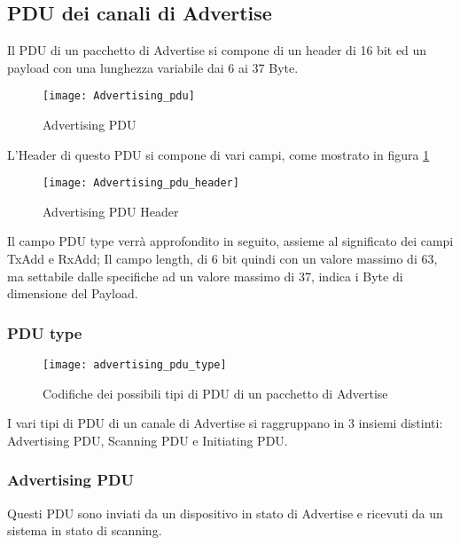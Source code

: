 


\subsection{PDU dei canali di Advertise}\label{pdus}
Il PDU di un pacchetto di Advertise si compone di un header di 16 bit ed un payload con una lunghezza variabile dai 6 ai 37 Byte.

\begin{figure}[H]
\texttt{[image: Advertising\_pdu]}
\centering
\caption{Advertising PDU}
\end{figure}

\noindent L'Header di questo PDU si compone di vari campi, come mostrato in figura \ref{Advertising_pdu_header}

\begin{figure}[H]
\texttt{[image: Advertising\_pdu\_header]}
\centering
\caption{Advertising PDU Header}
\label{Advertising_pdu_header}
\end{figure}

Il campo PDU type verrà approfondito in seguito, assieme al significato dei campi TxAdd e RxAdd; Il campo length, di 6 bit quindi con un valore massimo di 63, ma settabile dalle specifiche ad un valore massimo di 37, indica i Byte di dimensione del Payload.


\subsubsection{PDU type}

\begin{figure}[H]
\texttt{[image: advertising\_pdu\_type]}
\centering
\caption{Codifiche dei possibili tipi di PDU di un pacchetto di Advertise}
\end{figure}
 
I vari tipi di PDU di un canale di Advertise si raggruppano in 3 insiemi distinti: Advertising PDU, Scanning PDU e Initiating PDU.

\subsubsection{Advertising PDU}

Questi PDU sono inviati da un dispositivo in stato di Advertise e ricevuti da un sistema in stato di scanning.

